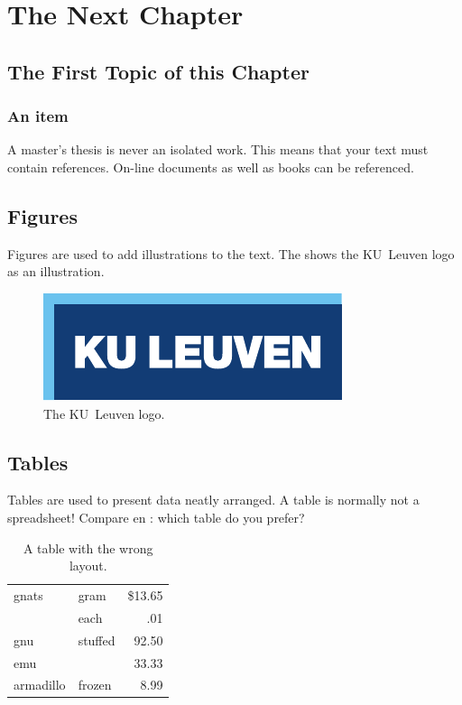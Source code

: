 \chapter{The Next Chapter}
\label{cha:2}
\lipsum[77]

\section{The First Topic of this Chapter}
\lipsum[78]

\subsection{An item}
A master's thesis is never an isolated work. This means that your text must
contain references. On-line documents\cite{wiki} as well as
books\cite{pratchett06:_good_omens} can be referenced.

\section{Figures}
Figures are used to add illustrations to the text. The  shows
the KU~Leuven logo as an illustration.
\begin{figure}
  \centering
  \includegraphics{config/logokul}
  \caption{The KU~Leuven logo.}
  \label{fig:logo}
\end{figure}

\section{Tables}
Tables are used to present data neatly arranged. A table is normally
not a spreadsheet! Compare  en : which table do
you prefer?

\begin{table}
  \centering
  \begin{tabular}{||l|lr||} \hline
    gnats     & gram      & \$13.65 \\ \cline{2-3}
              & each      & .01 \\ \hline
    gnu       & stuffed   & 92.50 \\ \cline{1-1} \cline{3-3}
    emu       &           & 33.33 \\ \hline
    armadillo & frozen    & 8.99 \\ \hline
  \end{tabular}
  \caption{A table with the wrong layout.}
  \label{tab:wrong}
\end{table}

